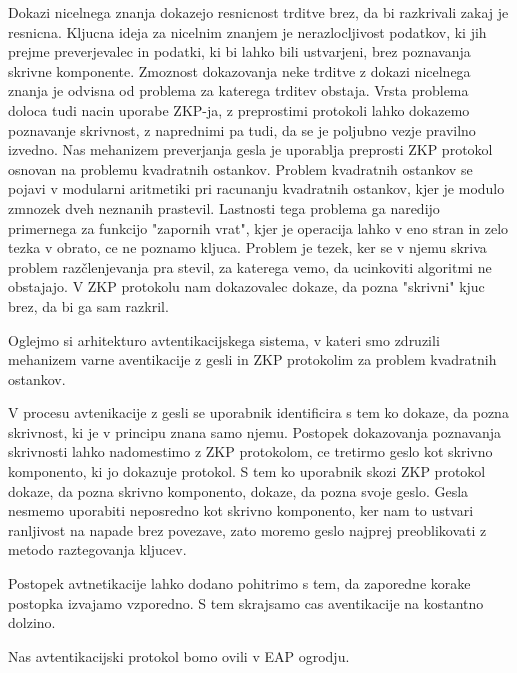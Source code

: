Dokazi nicelnega znanja dokazejo resnicnost trditve brez, da bi razkrivali zakaj je resnicna.
Kljucna ideja za nicelnim znanjem je nerazlocljivost podatkov, ki jih prejme preverjevalec in podatki, ki bi lahko bili ustvarjeni, brez poznavanja skrivne komponente.
Zmoznost dokazovanja neke trditve z dokazi nicelnega znanja je odvisna od problema za katerega trditev obstaja.
Vrsta problema doloca tudi nacin uporabe ZKP-ja, z preprostimi protokoli lahko dokazemo poznavanje skrivnost, z naprednimi pa tudi, da se je poljubno vezje pravilno izvedno.
Nas mehanizem preverjanja gesla je uporablja preprosti ZKP protokol osnovan na problemu kvadratnih ostankov.
Problem kvadratnih ostankov se pojavi v modularni aritmetiki pri racunanju kvadratnih ostankov, kjer je modulo zmnozek dveh neznanih prastevil. Lastnosti tega problema ga naredijo primernega za funkcijo "zapornih vrat", kjer je operacija lahko v eno stran in zelo tezka v obrato, ce ne poznamo kljuca.
Problem je tezek, ker se v njemu skriva problem razčlenjevanja pra stevil, za katerega vemo, da ucinkoviti algoritmi ne obstajajo.
V ZKP protokolu nam dokazovalec dokaze, da pozna "skrivni" kjuc brez, da bi ga sam razkril.

Oglejmo si arhitekturo avtentikacijskega sistema, v kateri smo zdruzili mehanizem varne aventikacije z gesli in ZKP protokolim za problem kvadratnih ostankov.

V procesu avtenikacije z gesli se uporabnik identificira s tem ko dokaze, da pozna skrivnost, ki je v principu znana samo njemu.
Postopek dokazovanja poznavanja skrivnosti lahko nadomestimo z ZKP protokolom, ce tretirmo geslo kot skrivno komponento, ki jo dokazuje protokol. S tem ko uporabnik skozi ZKP protokol dokaze, da pozna skrivno komponento, dokaze, da pozna svoje geslo.
Gesla nesmemo uporabiti neposredno kot skrivno komponento, ker nam to ustvari ranljivost na napade brez povezave, zato moremo geslo najprej preoblikovati z metodo raztegovanja kljucev.

Postopek avtnetikacije lahko dodano pohitrimo s tem, da zaporedne korake postopka izvajamo vzporedno. S tem skrajsamo cas aventikacije na kostantno dolzino.

%
Nas avtentikacijski protokol bomo ovili v EAP ogrodju.

%




